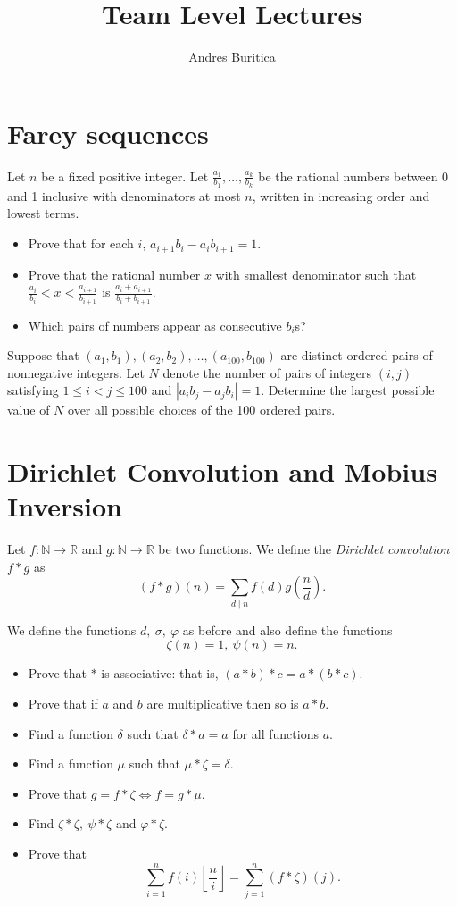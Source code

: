 \documentclass{article}
\title{Team Level Lectures}
\author{Andres Buritica}
\date{}
\begin{document}
\maketitle
\section{Farey sequences}
  Let $n$ be a fixed positive integer. Let
  $\frac{a_1}{b_1},\ldots,\frac{a_k}{b_k}$ be the rational numbers between 0
  and 1 inclusive with denominators at most $n$, written in increasing order
  and lowest terms.
  \begin{itemize}
    \item Prove that for each $i$, $a_{i+1}b_i-a_i b_{i+1}=1$.
    \item Prove that the rational number $x$ with smallest denominator such
      that $\frac{a_i}{b_i}<x<\frac{a_{i+1}}{b_{i+1}}$ is
      $\frac{a_i+a_{i+1}}{b_i+b_{i+1}}$. 
    \item Which pairs of numbers appear as consecutive $b_i$s?
  \end{itemize}

  Suppose that $(a_1,b_1),(a_2,b_2),\ldots,(a_{100},b_{100})$ are distinct
    ordered pairs of nonnegative integers.
    Let $N$ denote the number of pairs of integers $(i,j)$ satisfying
    $1\leq i<j\leq 100$ and $|a_i b_j-a_j b_i|=1$. 
    Determine the largest possible value of $N$ over all possible choices of the
    100 ordered pairs.
\section{Dirichlet Convolution and Mobius Inversion}
  Let $f:\mathbb N\to\mathbb R$ and $g:\mathbb N\to\mathbb R$ be two functions.
  We define the \emph{Dirichlet convolution} $f*g$ as
  \[(f*g)(n)=\sum_{d\mid n}f(d)g\left(\frac nd\right).\]

  We define the functions $d,\ \sigma,\ \varphi$ as before and also define the
  functions \[\zeta(n)=1,\ \psi(n)=n.\]
  \begin{itemize}
    \item Prove that $*$ is associative: that is,
      $(a*b)*c=a*(b*c)$.
    \item Prove that if $a$ and $b$ are multiplicative then so is $a*b$.
    \item Find a function $\delta$ such that $\delta*a=a$ for all functions $a$.
    \item Find a function $\mu$ such that $\mu*\zeta=\delta$.
    \item Prove that $g=f*\zeta\iff f=g*\mu$.
    \item Find $\zeta*\zeta,\ \psi*\zeta$ and $\varphi*\zeta$.
    \item Prove that
      \[\sum_{i=1}^n f(i)\left\lfloor\frac
          ni\right\rfloor=\sum_{j=1}^n(f*\zeta)(j).\]
  \end{itemize}
\end{document}
